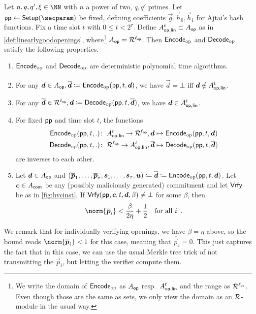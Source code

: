
\begin{theorem}\label{thm:EncodingOfOpenings}
Let $n,q,q',\xi\in\NN$ with $n$ a power of two, $q,q'$ primes.
Let $\params\gets\setup(\secparam)$ be fixed, defining coefficients $\vec{g},\vec{h}_0,\vec{h}_1$ for Ajtai's hash functions.
Fix a time slot $t$ with $0\leq t < 2^\tau$.
Define $A_{\mathsf{op,lin}}^{t}\subset A_{\mathsf{op}}$ as in \autoref{def:linearlygoodopenings}, where\footnote{We write the domain of $\mathsf{Encode}_{\mathrm{op}}$ as $A_{\mathsf{op}}$ resp.\ $A_{\mathsf{op,lin}}^{t}$ and the range as $\mathcal{R}^{\ell_{\mathsf{op}}}$. Even though those are the same as sets, we only view the domain as an $\mathcal{R}$-module in the usual way.} $A_{\mathsf{op}} = \mathcal{R}^{\ell_{\mathsf{op}}}$.
Then $\mathsf{Encode}_{\mathrm{op}}$ and $\mathsf{Decode}_{\mathrm{op}}$ satisfy the following properties.
\begin{enumerate}
 \item $\mathsf{Encode}_{\mathrm{op}}$ and $\mathsf{Decode}_{\mathrm{op}}$ are deterministic polynomial time algorithms. \label{item:openencodeispt}
 \item For any $\boldsymbol{d}\in A_{\mathsf{op}},\overline{\boldsymbol{d}} \coloneqq \mathsf{Encode}_{\mathrm{op}}(\mathsf{pp},t, \boldsymbol{d})$, we have $\overline{\vec{d}} = \bot$ iff $\boldsymbol{d}\notin A_{\mathsf{op,lin}}^{t}$.\label{item:openencodeworks}
 \item For any $\overline{\boldsymbol{d}}\in\mathcal{R}^{\ell_{\mathsf{op}}}, \boldsymbol{d}\coloneqq \mathsf{Decode}_{\mathrm{op}}(\mathsf{pp},t, \overline{\boldsymbol{d}})$, we have $\boldsymbol{d}\in A_{\mathsf{op,lin}}^{t}$. \label{item:opendecodeworks}
 \item For fixed $\mathsf{pp}$ and time slot $t$, the functions 
 \begin{align*}
 \mathsf{Encode}_{\mathrm{op}}(\mathsf{pp}, t, .)\colon\;A_{\mathsf{op,lin}}^{t} \to \mathcal{R}^{\ell_{\mathsf{op}}}&, \boldsymbol{d}\mapsto \mathsf{Encode}_{\mathrm{op}}(\mathsf{pp},t, \boldsymbol{d})\\
 \mathsf{Decode}_{\mathrm{op}}(\mathsf{pp}, t, .)\colon\;\mathcal{R}^{\ell_{\mathsf{op}}} \to A_{\mathsf{op,lin}}^{t}&, \overline{\boldsymbol{d}}\mapsto \mathsf{Decode}_{\mathrm{op}}(\mathsf{pp},t, \overline{\boldsymbol{d}})
 \end{align*}
are inverses to each other.\label{item:openencodeinverse}
\item Let $\boldsymbol{d}\in A_{\mathsf{op}}$ and $(\overline{\boldsymbol{p}}_1,\ldots,\overline{\boldsymbol{p}}_\tau,\boldsymbol{s}_1,\ldots,\boldsymbol{s}_\tau,\boldsymbol{u}) \coloneqq \overline{\boldsymbol{d}}\coloneqq \mathsf{Encode}_{\mathrm{op}}(\mathsf{pp},t, \boldsymbol{d})$. Let $\boldsymbol{c}\in A_{\mathsf{com}}$ be any (possibly maliciously generated) commitment and let $\mathsf{Vrfy}$ be as in \autoref{fig:hvcinst}. If $\mathsf{Vrfy}(\mathsf{pp}, \boldsymbol{c}, t,\boldsymbol{d}, \beta) \neq \bot$ for some $\beta$, then \label{item:openencodebounds}
\[
 \norm{\overline{\vec{p}}_i} < \frac{\beta}{2\eta} + \frac12\quad\text{for all $i$}\enspace.
\]
\end{enumerate}
We remark that for individually verifying openings, we have $\beta=\eta$ above, so the bound reads $\norm{\overline{\vec{p}}_i} < 1$ for this case, meaning that $\overline{\vec{p}}_i = 0$.
This just captures the fact that in this case, we can use the usual Merkle tree trick of not transmitting the $\vec{p}_i$, but letting the verifier compute them.
\end{theorem}
